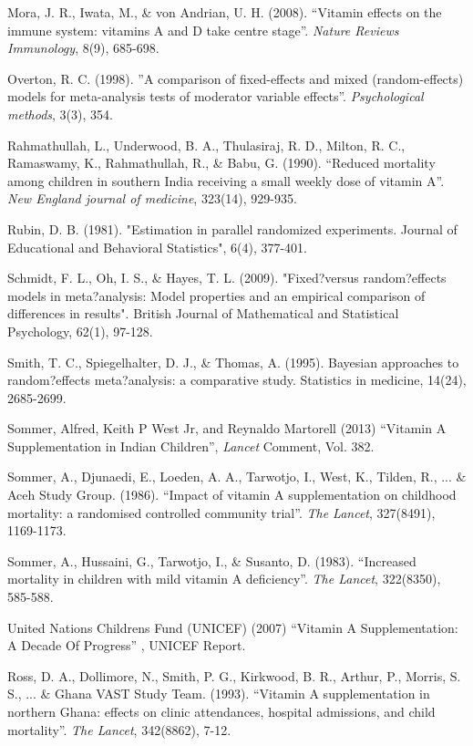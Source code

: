 \documentclass[12pt]{article}
\begin{document}
\begin{thebibliography}{99}
 Mora, J. R., Iwata, M., \& von Andrian, U. H. (2008). ``Vitamin effects on the immune system: vitamins A and D take centre stage''. \emph{Nature Reviews Immunology}, 8(9), 685-698.

 Overton, R. C. (1998). ''A comparison of fixed-effects and mixed (random-effects) models for meta-analysis tests of moderator variable effects''. \emph{Psychological methods}, 3(3), 354.

 Rahmathullah, L., Underwood, B. A., Thulasiraj, R. D., Milton, R. C., Ramaswamy, K., Rahmathullah, R., \& Babu, G. (1990). ``Reduced mortality among children in southern India receiving a small weekly dose of vitamin A''. \emph{New England journal of medicine}, 323(14), 929-935.

 Rubin, D. B. (1981). "Estimation in parallel randomized experiments. Journal of Educational and Behavioral Statistics", 6(4), 377-401.

 Schmidt, F. L., Oh, I. S., \& Hayes, T. L. (2009). "Fixed?versus random?effects models in meta?analysis: Model properties and an empirical comparison of differences in results". British Journal of Mathematical and Statistical Psychology, 62(1), 97-128.

 Smith, T. C., Spiegelhalter, D. J., \& Thomas, A. (1995). Bayesian approaches to random?effects meta?analysis: a comparative study. Statistics in medicine, 14(24), 2685-2699.

 Sommer, Alfred, Keith P West Jr, and Reynaldo Martorell (2013) ``Vitamin A Supplementation in Indian Children'', \emph{Lancet} Comment, Vol. 382.

 Sommer, A., Djunaedi, E., Loeden, A. A., Tarwotjo, I., West, K., Tilden, R., ... \& Aceh Study Group. (1986). ``Impact of vitamin A supplementation on childhood mortality: a randomised controlled community trial''. \emph{The Lancet}, 327(8491), 1169-1173.

 Sommer, A., Hussaini, G., Tarwotjo, I., \& Susanto, D. (1983). ``Increased mortality in children with mild vitamin A deficiency''. \emph{The Lancet}, 322(8350), 585-588.

 United Nations Childrens Fund (UNICEF) (2007) ``Vitamin A Supplementation: A Decade Of Progress'' , UNICEF Report. 

 Ross, D. A., Dollimore, N., Smith, P. G., Kirkwood, B. R., Arthur, P., Morris, S. S., ... \& Ghana VAST Study Team. (1993). ``Vitamin A supplementation in northern Ghana: effects on clinic attendances, hospital admissions, and child mortality''. \emph{The Lancet}, 342(8862), 7-12.


\end{thebibliography}
\end{document}
